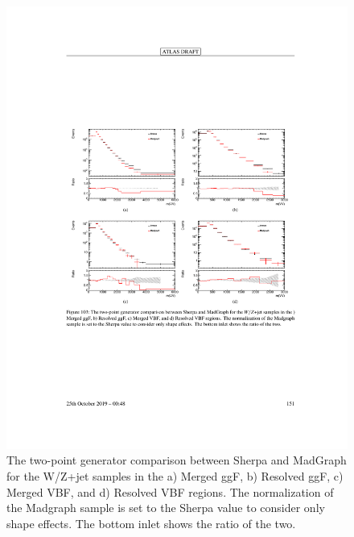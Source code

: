 \begin{figure}[h!]
  \centering
  \includegraphics[width=\hsize]{figures/Analysis/modelingsysts/w_gen.pdf}
            \caption{The two-point generator comparison between Sherpa and MadGraph for the W/Z+jet samples in the a) Merged ggF, b) Resolved ggF, c) Merged VBF, and d) Resolved VBF regions. The normalization of the Madgraph sample is set to the Sherpa value to consider only shape effects. The bottom inlet shows the ratio of the two.} 
  \label{fig:w_gen}
\end{figure} 
\FloatBarrier



